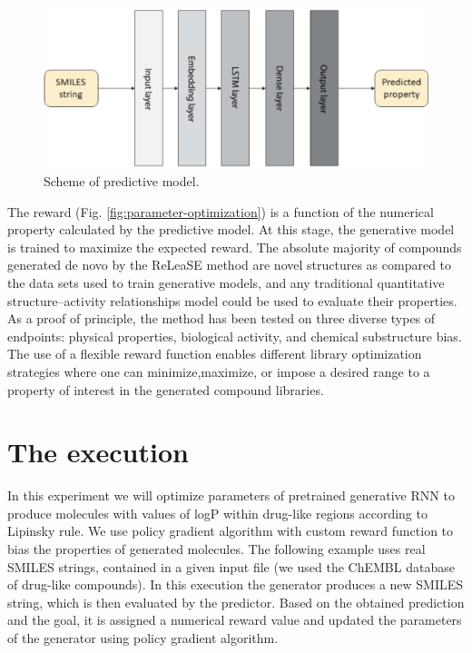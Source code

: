 \documentclass[a4paper]{article}
\begin{document}
\begin{figure}[htbp]
		\centering
			\includegraphics[width=\textwidth]{smiles-to-predicted-property.png}
		\caption{Scheme of predictive model.}
		\label{fig:smiles-to-predicted-property}
	\end{figure}
	
The reward (Fig. \ref{fig:parameter-optimization}) is a function of the numerical property calculated by the predictive model. At this stage, the generative model is trained to maximize the expected reward.
The absolute majority of compounds generated de novo by the ReLeaSE method are novel structures as compared to the data sets used to train generative models, and any traditional quantitative structure–activity relationships model could be used to evaluate their properties.
As a proof of principle, the method has been tested on three diverse types of endpoints: physical properties, biological activity, and chemical substructure bias. The use of a flexible reward function enables different library optimization strategies where one can minimize,maximize, or impose a desired range to a property of interest in the generated compound libraries.

\section{The execution}\label{sec:The execution}

In this experiment we will optimize parameters of pretrained generative RNN to produce molecules with values of logP within drug-like regions according to Lipinsky rule. We use policy gradient algorithm with custom reward function to bias the properties of generated molecules.
The following example uses real SMILES strings, contained in a given input file (we used the ChEMBL database of drug-like compounds).
In this execution the generator produces a new SMILES string, which is then evaluated by the predictor. Based on the obtained prediction and the goal, it is assigned a numerical reward value and updated the parameters of the generator using policy gradient algorithm.
 
\end{document}
